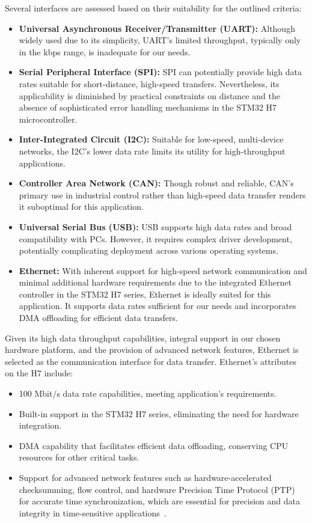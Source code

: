 \documentclass[12pt, a4paper]{extarticle}
\begin{document}
Several interfaces are assessed based on their suitability for the outlined
criteria:
\begin{itemize}[noitemsep]
    \item \textbf{Universal Asynchronous Receiver/Transmitter (UART):} Although
        widely used due to its simplicity, UART's limited throughput, typically
        only in the kbps range, is inadequate for our needs.
    \item \textbf{Serial Peripheral Interface (SPI):} SPI can potentially
        provide high data rates suitable for short-distance, high-speed
        transfers. Nevertheless, its applicability is diminished by practical
        constraints on distance and the absence of sophisticated error handling
        mechanisms in the STM32 H7 microcontroller.
    \item \textbf{Inter-Integrated Circuit (I2C):} Suitable for low-speed,
        multi-device networks, the I2C's lower data rate limits its utility for
        high-throughput applications.
    \item \textbf{Controller Area Network (CAN):} Though robust and reliable,
        CAN's primary use in industrial control rather than high-speed data
        transfer renders it suboptimal for this application.
    \item \textbf{Universal Serial Bus (USB):} USB supports high data rates and
        broad compatibility with PCs. However, it requires complex driver
        development, potentially complicating deployment across various
        operating systems.
    \item \textbf{Ethernet:} With inherent support for high-speed network
        communication and minimal additional hardware requirements due to the
        integrated Ethernet controller in the STM32 H7 series, Ethernet is
        ideally suited for this application. It supports data rates sufficient
        for our needs and incorporates DMA offloading for efficient data
        transfers.
\end{itemize}

Given its high data throughput capabilities, integral support in our chosen
hardware platform, and the provision of advanced network features, Ethernet is
selected as the communication interface for data transfer. Ethernet's
attributes on the H7 include:

\begin{itemize}[noitemsep]
    \item 100 Mbit/s data rate capabilities, meeting application's requirements.
    \item Built-in support in the STM32 H7 series, eliminating the need for hardware integration.
    \item DMA capability that facilitates efficient data offloading, conserving CPU resources for other critical tasks.
    \item Support for advanced network features such as hardware-accelerated
        checksumming, flow control, and hardware Precision Time Protocol (PTP)
        for accurate time synchronization, which are essential for precision
        and data integrity in time-sensitive applications~\cite{ieee1588-2008}.
\end{itemize}
\end{document}
